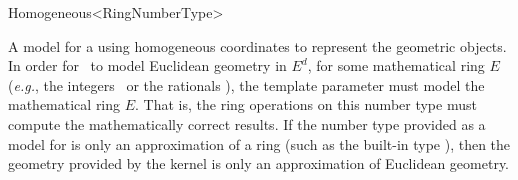 \begin{ccRefClass}{Homogeneous<RingNumberType>}

\ccDefinition
A model for a  using homogeneous coordinates to represent the
geometric objects.  In order for \ccRefName\ to model Euclidean geometry
in $E^d$, for some mathematical ring $E$ (\textit{e.g.},
the integers \Z\ or the rationals \Q), the template parameter 
must model the mathematical ring $E$.  That is, the ring operations on this
number type must compute the mathematically correct results.  If the number
type provided as a model for  is only an approximation of a
ring (such as the built-in type ), then the geometry provided by
the kernel is only an approximation of Euclidean geometry.  

\ccIsModel
{}

\ccSeeAlso
{}

\end{ccRefClass}
